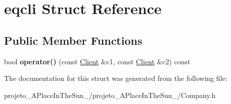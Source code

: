 \hypertarget{structeqcli}{}\section{eqcli Struct Reference}
\label{structeqcli}
\subsection*{Public Member Functions}
\begin{DoxyCompactItemize}
\item 
\hypertarget{structeqcli_aab16e9d6ff39c06dbfd4c2ec13de5895}{}\label{structeqcli_aab16e9d6ff39c06dbfd4c2ec13de5895} 
bool {\bfseries operator()} (const \hyperlink{class_client}{Client} \&c1, const \hyperlink{class_client}{Client} \&c2) const
\end{DoxyCompactItemize}


The documentation for this struct was generated from the following file\+:\begin{DoxyCompactItemize}
\item 
projeto\+\_\+\+A\+Place\+In\+The\+Sun\+\_/projeto\+\_\+\+A\+Place\+In\+The\+Sun\+\_/Company.\+h\end{DoxyCompactItemize}
